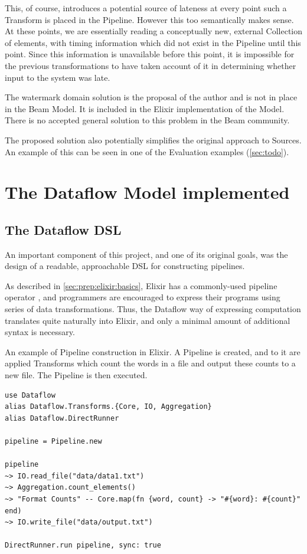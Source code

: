 This, of course, introduces a potential source of lateness at every point such a Transform is placed in the Pipeline.
However this too semantically makes sense.
At these points, we are essentially reading a conceptually new, external Collection of elements, with timing information which did not exist in the Pipeline until this point.
Since this information is unavailable before this point, it is impossible for the previous transformations to have taken account of it in determining whether input to the system was late.

The watermark domain solution is the proposal of the author and is not in place in the Beam Model.
It is included in the Elixir implementation of the Model.
There is no accepted general solution to this problem in the Beam community.

The proposed solution also potentially simplifies the original approach to Sources.
An example of this can be seen in one of the Evaluation examples (\cref{sec:todo}).


\section{The Dataflow Model implemented}\label{sec:impl:approach}

\subsection{The Dataflow DSL}\label{sec:impl:approach:dsl}

An important component of this project, and one of its original goals, was the design of a readable, approachable DSL for constructing pipelines.

As described in \cref{sec:prep:elixir:basics}, Elixir has a commonly-used pipeline operator \exs{|>}, and programmers are encouraged to express their programs using series of data transformations.
Thus, the Dataflow way of expressing computation translates quite naturally into Elixir, and only a minimal amount of additional syntax is necessary.

\begin{listing}[h]
	\caption{An example of Pipeline construction in Elixir. A Pipeline is created, and to it are applied Transforms which count the words in a file and output these counts to a new file. The Pipeline is then executed.}
	\label{lst:impl:elixir-construct-pipeline}
	\begin{verbatim}
use Dataflow
alias Dataflow.Transforms.{Core, IO, Aggregation}
alias Dataflow.DirectRunner

pipeline = Pipeline.new

pipeline
~> IO.read_file("data/data1.txt")
~> Aggregation.count_elements()
~> "Format Counts" -- Core.map(fn {word, count} -> "#{word}: #{count}" end)
~> IO.write_file("data/output.txt")

DirectRunner.run pipeline, sync: true

	\end{verbatim}
\end{listing}

